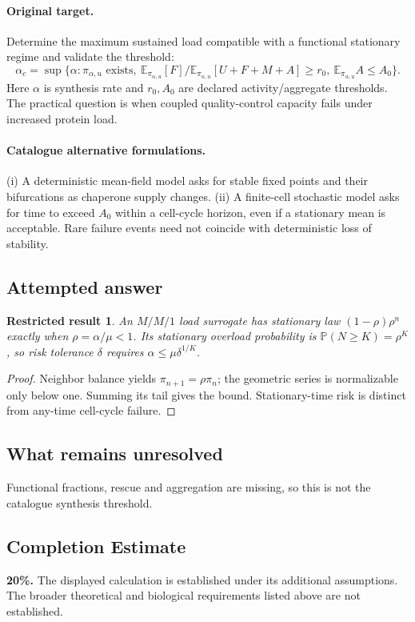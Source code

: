 \documentclass[11pt]{article}
\newcommand{\E}{\mathbb E}
\newcommand{\Prob}{\mathbb P}
\providecommand{\E}{\mathbb E}
\providecommand{\Prob}{\mathbb P}
\newtheorem{attemptresult}{Restricted result}[section]
\begin{document}
\paragraph{Original target.}
Determine the maximum sustained load compatible with a functional stationary regime and validate the threshold:
\[
\alpha_c=\sup\{\alpha:\pi_{\alpha,u}\text{ exists},\ 
\E_{\pi_{\alpha,u}}[F]/\E_{\pi_{\alpha,u}}[U+F+M+A]\geq r_0,
\ \E_{\pi_{\alpha,u}}A\leq A_0\}.
\]
Here $\alpha$ is synthesis rate and $r_0,A_0$ are declared activity/aggregate thresholds. The practical question is when coupled quality-control capacity fails under increased protein load.
\paragraph{Catalogue alternative formulations.}
(i) A deterministic mean-field model asks for stable fixed points and their bifurcations as chaperone supply changes. (ii) A finite-cell stochastic model asks for time to exceed $A_0$ within a cell-cycle horizon, even if a stationary mean is acceptable. Rare failure events need not coincide with deterministic loss of stability.
\subsection{Attempted answer}
\begin{attemptresult}
An $M/M/1$ load surrogate has stationary law $(1-\rho)\rho^n$ exactly when $\rho=\alpha/\mu<1$. Its stationary overload probability is $\Prob(N\geq K)=\rho^K$, so risk tolerance $\delta$ requires $\alpha\leq\mu\delta^{1/K}$.
\end{attemptresult}
\begin{proof}
Neighbor balance yields $\pi_{n+1}=\rho\pi_n$; the geometric series is normalizable only below one. Summing its tail gives the bound. Stationary-time risk is distinct from any-time cell-cycle failure.
\end{proof}
\subsection{What remains unresolved}
Functional fractions, rescue and aggregation are missing, so this is not the catalogue synthesis threshold.
\subsection{Completion Estimate}
\textbf{20\%.} The displayed calculation is established under its additional assumptions. The broader theoretical and biological requirements listed above are not established.
\end{document}
